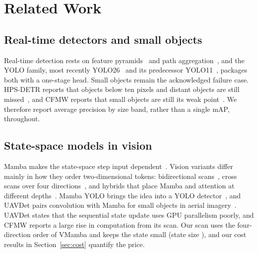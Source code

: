 \section{Related Work}
\label{sec:related}
\subsection{Real-time detectors and small objects}
Real-time detection rests on feature pyramids~\cite{lin2017fpn} and path aggregation~\cite{liu2018panet}, and the YOLO family, most recently YOLO26~\cite{yolo26_2026} and its predecessor YOLO11~\cite{yolo11_2024}, packages both with a one-stage head. Small objects remain the acknowledged failure case. HPS-DETR reports that objects below ten pixels and distant objects are still missed~\cite{wang2025hpsdetr}, and CFMW reports that small objects are still its weak point~\cite{li2025cfmw}. We therefore report average precision by size band, rather than a single mAP, throughout.

\subsection{State-space models in vision}
Mamba makes the state-space step input dependent~\cite{gu2023mamba}. Vision variants differ mainly in how they order two-dimensional tokens: bidirectional scans~\cite{zhu2024vim}, cross scans over four directions~\cite{liu2024vmamba}, and hybrids that place Mamba and attention at different depths~\cite{hatamizadeh2025mambavision}. Mamba YOLO brings the idea into a YOLO detector~\cite{wang2025mambayolo}, and UAVDet pairs convolution with Mamba for small objects in aerial imagery~\cite{yang2026uavdet}. UAVDet states that the sequential state update uses GPU parallelism poorly, and CFMW reports a large rise in computation from its scan. Our scan uses the four-direction order of VMamba and keeps the state small (state size \cfgDState{}), and our cost results in Section~\ref{sec:cost} quantify the price.

